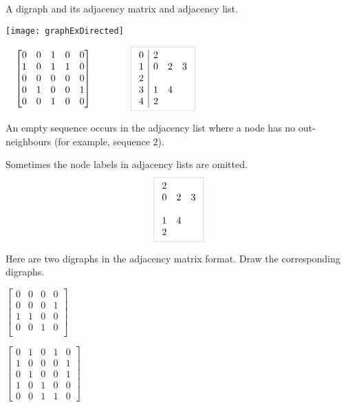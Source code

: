\begin{Boxample}
A digraph and its adjacency matrix and adjacency list.\\
\begin{center}
\begin{minipage}[c]{0.3\textwidth}
\centering
\texttt{[image: graphExDirected]}
\end{minipage}
\begin{minipage}[c]{0.65\textwidth}
$\quad\left[
	\begin{matrix}
	0 & 0 & 1 & 0 & 0 \\
	1 & 0 & 1 & 1 & 0 \\
	0 & 0 & 0 & 0 & 0 \\
	0 & 1 & 0 & 0 & 1 \\
	0 & 0 & 1 & 0 & 0 
	\end{matrix}
\right]
\qquad \qquad
\lightgraybox{
	\begin{array}{c|ccc}
	0 & 2  \\
	1 & 0 & 2 & 3  \\
	2  \\
	3 & 1 & 4  \\
	4 & 2 \\
	\end{array}
}$
\end{minipage}
\end{center}
An empty sequence occurs in the adjacency list where a node has no out-neighbours (for example, sequence $2$). 
\end{Boxample}

Sometimes the node labels in adjacency lists are omitted.
$$\lightgraybox{
	\begin{array}{ccc}
	2 &   &   \\
	0 & 2 & 3 \\
	  &   &   \\
	1 & 4 &   \\
	2 &   &   \\
	\end{array}
}$$

\begin{Boxample}[2]
Here are two digraphs in the adjacency matrix format. Draw the corresponding digraphs.

	\vspace{1.5cm}
	$\left[
	\begin{matrix}
	0 & 0 & 0 & 0  \\
	0 & 0 & 0 & 1  \\
	1 & 1 & 0 & 0  \\
	0 & 0 & 1 & 0  \\
	\end{matrix}
	\right]$
	
	\vspace{2.5cm}
	$\left[
	\begin{matrix}
	0 & 1 & 0 & 1 & 0 \\
	1 & 0 & 0 & 0 & 1 \\
	0 & 1 & 0 & 0 & 1 \\
	1 & 0 & 1 & 0 & 0 \\
	0 & 0 & 1 & 1 & 0 
	\end{matrix}
	\right]$
\end{Boxample}

